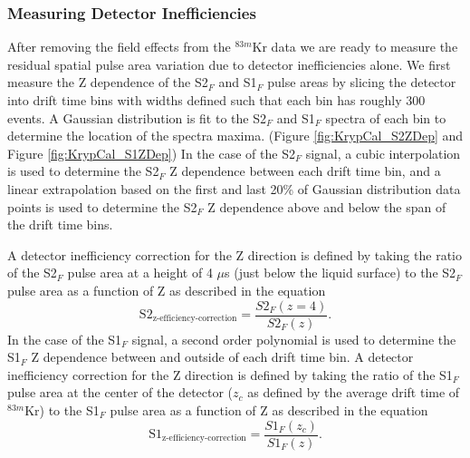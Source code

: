 \subsubsection{Measuring Detector Inefficiencies}


After removing the field effects from the $^{83m}$Kr data we are ready to measure the residual spatial pulse area variation due to detector inefficiencies alone.  We first measure the Z dependence of the S2$_F$ and S1$_F$ pulse areas by slicing the detector into drift time bins with widths defined such that each bin has roughly 300 events.  A Gaussian distribution is fit to the S2$_F$ and S1$_F$ spectra of each bin to determine the location of the spectra maxima. (Figure \ref{fig:KrypCal_S2ZDep} and Figure \ref{fig:KrypCal_S1ZDep}) In the case of the S2$_F$ signal, a cubic interpolation is used to determine the S2$_F$ Z dependence between each drift time bin, and a linear extrapolation based on the first and last 20\% of Gaussian distribution data points is used to determine the S2$_F$ Z dependence above and below the span of the drift time bins.  

A detector inefficiency correction for the Z direction is defined by taking the ratio of the S2$_F$  pulse area at a height of 4 $\mu$s (just below the liquid surface) to the S2$_F$ pulse area as a function of Z as described in the equation
\begin{equation}
\mbox{S}2_{\mbox{z-efficiency-correction}} = \frac{S2_F(z=4)}{S2_F(z)}.
\end{equation} 
In the case of the S1$_F$ signal, a second order polynomial is used to determine the S1$_F$ Z dependence between and outside of each drift time bin. A detector inefficiency correction for the Z direction is defined by taking the ratio of the S1$_F$  pulse area at the center of the detector ($z_c$ as defined by the average drift time of $^{83m}$Kr) to the S1$_F$ pulse area as a function of Z as described in the equation
\begin{equation}
\mbox{S}1_{\mbox{z-efficiency-correction}} = \frac{S1_F(z_c)}{S1_F(z)}.
\end{equation} 

